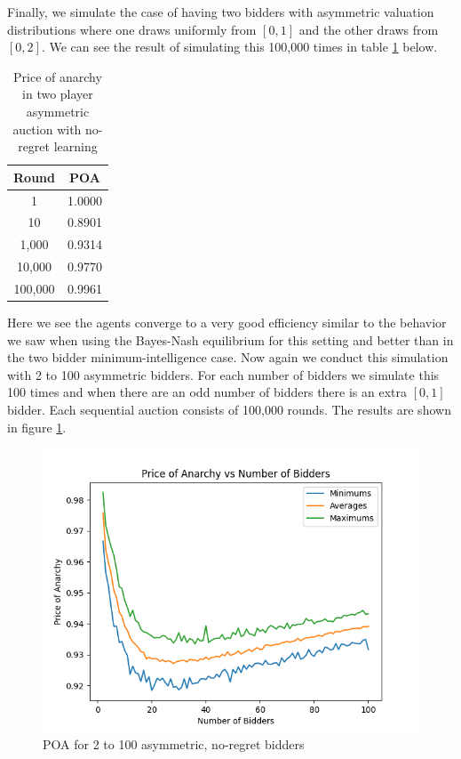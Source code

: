 \documentclass[12pt,twoside]{reedthesis}
\begin{document}
Finally, we simulate the case of having two bidders with asymmetric valuation distributions where one draws uniformly from $[0,1]$ and the other draws from $[0,2]$. We can see the result of simulating this 100,000 times in table \ref{table:5} below.

\begin{table}[h!]
	\begin{center}
		\begin{tabular}{ |c|c| }
			\hline
			Round & POA \\
			\hline
			1 & 1.0000 \\
			10 & 0.8901 \\
			1,000 & 0.9314 \\
			10,000 & 0.9770 \\
			100,000 & 0.9961 \\
			\hline
		\end{tabular}
		\caption{Price of anarchy in two player asymmetric auction with no-regret learning}
		\label{table:5}
	\end{center} 
\end{table}

Here we see the agents converge to a very good efficiency similar to the behavior we saw when using the Bayes-Nash equilibrium for this setting and better than in the two bidder minimum-intelligence case. Now again we conduct this simulation with 2 to 100 asymmetric bidders. For each number of bidders we simulate this 100 times and when there are an odd number of bidders there is an extra $[0,1]$ bidder. Each sequential auction consists of 100,000 rounds. The results are shown in figure \ref{figure:asymmetric}.

\begin{figure}[h!]
	\centering
	\includegraphics[scale=.8]{Figures/asymmetric}
	\caption{POA for 2 to 100 asymmetric, no-regret bidders}
	\label{figure:asymmetric}
\end{figure}
\end{document}
